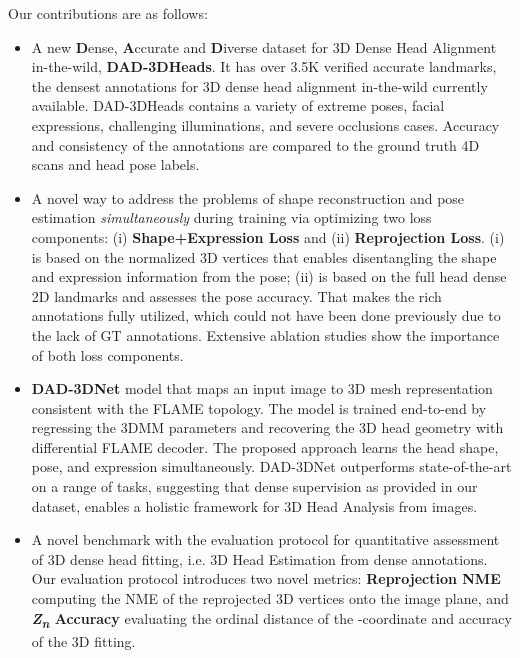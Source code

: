 \documentclass[10pt,twocolumn,letterpaper]{article}
\begin{document}
Our contributions are as follows:
\begin{itemize}
\vspace{-0.5em}
    \item
A new \textbf{D}ense, \textbf{A}ccurate and \textbf{D}iverse dataset for 3D Dense Head Alignment in-the-wild, \textbf{DAD-3DHeads}.
It has over 3.5K verified accurate landmarks, the densest annotations for 3D dense head alignment in-the-wild currently available. DAD-3DHeads contains a variety of extreme poses, facial expressions, challenging illuminations, and severe occlusions cases.
    Accuracy and consistency of the annotations are compared to the ground truth 4D scans and head pose labels.
\vspace{-0.5em}
    \item 
A novel way to address the problems of shape reconstruction and pose estimation \emph{simultaneously} during training via optimizing two loss components: (i) \textbf{Shape+Expression Loss} and (ii) \textbf{Reprojection Loss}. 
    (i) is based on the normalized 3D vertices that enables disentangling the shape and expression information from the pose; (ii) is based on the full head dense 2D landmarks and assesses the pose accuracy.
    That makes the rich annotations fully utilized, which could not have been done previously due to the lack of GT annotations. 
    Extensive ablation studies show the importance of both loss components.
    \vspace{-0.5em}
    \item 
    \textbf{DAD-3DNet} model that maps an input image to 3D mesh representation consistent with the FLAME topology. 
    The model is trained end-to-end by regressing the 3DMM parameters and recovering the 3D head geometry with differential FLAME decoder. 
    The proposed approach learns the head shape, pose, and expression simultaneously. 
    DAD-3DNet outperforms state-of-the-art on a range of tasks, suggesting that dense supervision as provided in our dataset, enables a holistic framework for 3D Head Analysis from images. \vspace{-0.5em}
    \item  
    A novel benchmark with the evaluation protocol for quantitative assessment of 3D dense head fitting, i.e. 3D Head Estimation from dense annotations.
Our evaluation protocol introduces two novel metrics: \textbf{Reprojection NME} computing the NME of the reprojected 3D vertices onto the image plane, and \textbf{\textit{Z\textsubscript{n}} Accuracy} evaluating the ordinal distance of the -coordinate and accuracy of the 3D fitting. 
\end{itemize}
%
\end{document}
